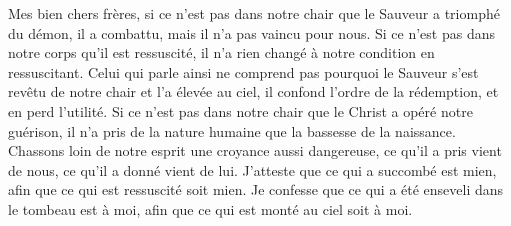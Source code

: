 Mes bien chers frères,
	si ce n’est pas dans notre chair que le Sauveur a triomphé du démon,
	il a combattu, mais il n’a pas vaincu pour nous.
Si ce n’est pas dans notre corps qu’il est ressuscité,
	il n’a rien changé à notre condition en ressuscitant.
Celui qui parle ainsi
	ne comprend pas pourquoi le Sauveur s’est revêtu de notre chair
		et l’a élevée au ciel,
	il confond l’ordre de la rédemption, et en perd l’utilité.
Si ce n’est pas dans notre chair que le Christ a opéré notre guérison,
	il n’a pris de la nature humaine que la bassesse de la naissance.
Chassons loin de notre esprit une croyance aussi dangereuse,
	ce qu’il a pris vient de nous, ce qu’il a donné vient de lui.
J’atteste que ce qui a succombé est mien,
	afin que ce qui est ressuscité soit mien.
Je confesse que ce qui a été enseveli dans le tombeau est à moi,
	afin que ce qui est monté au ciel soit à moi.

